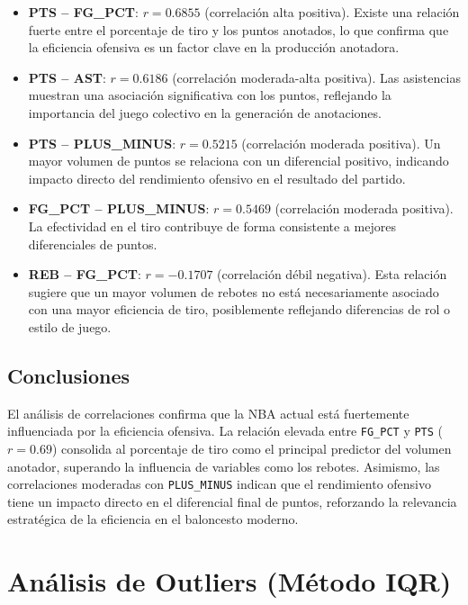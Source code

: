 \documentclass[12pt]{article}
\begin{document}
\begin{itemize}
    \item \textbf{PTS -- FG\_PCT}: $r = 0.6855$ (correlación alta positiva).  
    Existe una relación fuerte entre el porcentaje de tiro y los puntos anotados, lo que confirma que la eficiencia ofensiva es un factor clave en la producción anotadora.

    \item \textbf{PTS -- AST}: $r = 0.6186$ (correlación moderada-alta positiva).  
    Las asistencias muestran una asociación significativa con los puntos, reflejando la importancia del juego colectivo en la generación de anotaciones.

    \item \textbf{PTS -- PLUS\_MINUS}: $r = 0.5215$ (correlación moderada positiva).  
    Un mayor volumen de puntos se relaciona con un diferencial positivo, indicando impacto directo del rendimiento ofensivo en el resultado del partido.

    \item \textbf{FG\_PCT -- PLUS\_MINUS}: $r = 0.5469$ (correlación moderada positiva).  
    La efectividad en el tiro contribuye de forma consistente a mejores diferenciales de puntos.

    \item \textbf{REB -- FG\_PCT}: $r = -0.1707$ (correlación débil negativa).  
    Esta relación sugiere que un mayor volumen de rebotes no está necesariamente asociado con una mayor eficiencia de tiro, posiblemente reflejando diferencias de rol o estilo de juego.
\end{itemize}

\subsection{Conclusiones}

El análisis de correlaciones confirma que la NBA actual está fuertemente influenciada por la eficiencia ofensiva. La relación elevada entre \texttt{FG\_PCT} y \texttt{PTS} ($r = 0.69$) consolida al porcentaje de tiro como el principal predictor del volumen anotador, superando la influencia de variables como los rebotes. Asimismo, las correlaciones moderadas con \texttt{PLUS\_MINUS} indican que el rendimiento ofensivo tiene un impacto directo en el diferencial final de puntos, reforzando la relevancia estratégica de la eficiencia en el baloncesto moderno.

\section{Análisis de Outliers (Método IQR)}
\end{document}
